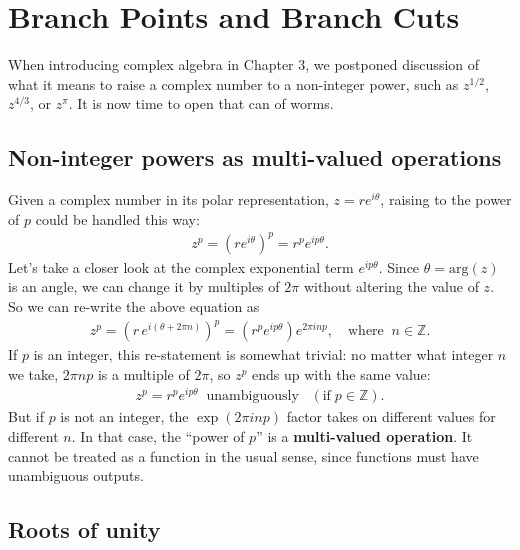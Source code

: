 \documentclass[10pt,a4paper]{article}
\begin{document}
\setcounter{page}{52}

\section{Branch Points and Branch Cuts}
\label{branch-points-and-branch-cuts}

When introducing complex algebra in Chapter 3, we postponed discussion
of what it means to raise a complex number to a non-integer power,
such as $z^{1/2}$, $z^{4/3}$, or $z^{\pi}$. It is now time to open
that can of worms.

\subsection{Non-integer powers as multi-valued operations}
\label{non-integer-powers-as-multi-valued-operations}

Given a complex number in its polar representation, $z = r
e^{i\theta}$, raising to the power of $p$ could be handled this way:
\begin{align}
  z^p = \left(re^{i\theta}\right)^p = r^p e^{ip\theta}.
\end{align}
Let's take a closer look at the complex exponential term
$e^{ip\theta}$.  Since $\theta = \mathrm{arg}(z)$ is an angle, we can
change it by multiples of $2\pi$ without altering the value of $z$.
So we can re-write the above equation as
\begin{align}
  z^p = \left(r\,e^{i(\theta + 2\pi n)}\right)^p = \left(r^p e^{ip\theta} \right) e^{2\pi i n p}, \quad \mathrm{where}\;\; n\in\mathbb{Z}.
\end{align}
If $p$ is an integer, this re-statement is somewhat trivial: no matter
what integer $n$ we take, $2\pi n p$ is a multiple of $2\pi$, so $z^p$
ends up with the same value:
\begin{align}
  z^p = r^p e^{ip\theta} \;\;\textrm{unambiguously} \;\;\;(\text{if}\;p\in\mathbb{Z}).
\end{align}
But if $p$ is not an integer, the $\exp\left(2 \pi i np\right)$ factor
takes on different values for different $n$. In that case, the ``power
of $p$'' is a \textbf{multi-valued operation}. It cannot be treated as
a function in the usual sense, since functions must have unambiguous
outputs.

\subsection{Roots of unity}\label{roots-of-unity}
\end{document}
